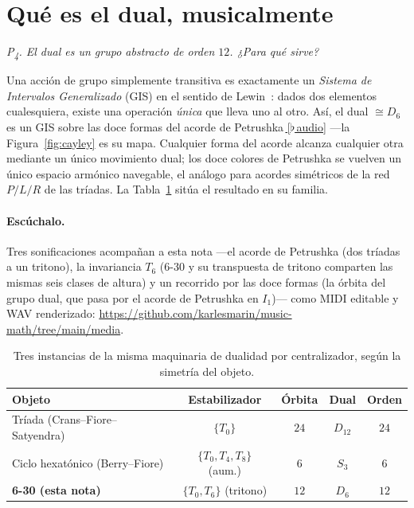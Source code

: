 \documentclass[11pt]{article}
\newcommand{\Dgrp}[1]{D_{#1}}
\newcommand{\question}[1]{\smallskip\noindent\textit{#1}\smallskip}
\newcommand{\audiobase}{https://github.com/karlesmarin/music-math/raw/main/media}
\newcommand{\audio}[1]{\href{\audiobase/#1}{\textcolor{ctA}{\footnotesize\,[$\flat$\,audio]}}}
\begin{document}
\section{Qué es el dual, musicalmente}\label{sec:music}

\question{P\textsubscript{4}. El dual es un grupo abstracto de orden $12$. ¿Para qué \emph{sirve}?}

Una acción de grupo simplemente transitiva es exactamente un \emph{Sistema de Intervalos Generalizado}
(GIS) en el sentido de Lewin~\cite[p.~157]{Lewin}: dados dos elementos cualesquiera, existe una operación
\emph{única} que lleva uno al otro. Así, el dual $\cong\Dgrp{6}$ es un GIS sobre las doce formas del
acorde de Petrushka\,\audio{orbit_12.wav} ---la Figura~\ref{fig:cayley} es su mapa. Cualquier forma del acorde alcanza
cualquier otra mediante un único movimiento dual; los doce colores de Petrushka se vuelven un único
espacio armónico navegable, el análogo para acordes simétricos de la red $P/L/R$ de las tríadas. La
Tabla~\ref{tab:family} sitúa el resultado en su familia.

\paragraph{Escúchalo.} Tres sonificaciones acompañan a esta nota ---el acorde de Petrushka (dos tríadas
a un tritono), la invariancia $T_6$ (6-30 y su transpuesta de tritono comparten las mismas seis clases
de altura) y un recorrido por las doce formas (la órbita del grupo dual, que pasa por el acorde de
Petrushka en $I_1$)--- como MIDI editable y WAV renderizado:
\url{https://github.com/karlesmarin/music-math/tree/main/media}.

\begin{table}[h]
\centering\small
\setlength{\tabcolsep}{5pt}
\begin{tabular}{@{}lcccc@{}}
\toprule
\rowcolor{ctA!22}
Objeto & Estabilizador & Órbita & Dual & Orden\\
\midrule
Tríada (Crans--Fiore--Satyendra) & $\{T_0\}$ & $24$ & $\Dgrp{12}$ & $24$\\
Ciclo hexatónico (Berry--Fiore) & $\{T_0,T_4,T_8\}$ (aum.) & $6$ & $S_3$ & $6$\\
\textbf{6-30 (esta nota)} & $\{T_0,T_6\}$ (tritono) & $12$ & $\Dgrp{6}$ & $12$\\
\bottomrule
\end{tabular}
\caption{Tres instancias de la misma maquinaria de dualidad por centralizador, según la simetría del
objeto.}
\label{tab:family}
\end{table}
\end{document}
